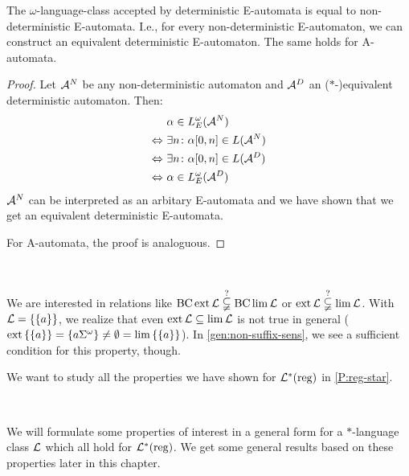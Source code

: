 \begin{lemma}
\label{gen:e-determinism}
The $\omega$-language-class accepted by deterministic E-automata is equal to non-deterministic E-automata. I.e., for every non-deterministic E-automaton, we can construct an equivalent deterministic E-automaton. The same holds for A-automata.
\begin{proof} Let $\mathcal{A}^N$ be any non-deterministic automaton and $\mathcal{A}^D$ an ($*$-)equivalent deterministic automaton. Then:
\begin{align*}
& \alpha \in L^{\omega}_E(\mathcal{A}^N) \\
\Leftrightarrow \ & \exists n \colon \alpha[0,n] \in L(\mathcal{A}^N) \\
\Leftrightarrow \ & \exists n \colon \alpha[0,n] \in L(\mathcal{A}^D) \\
\Leftrightarrow \ & \alpha \in L^{\omega}_E(\mathcal{A}^D)
\end{align*}
$\mathcal{A}^N$ can be interpreted as an arbitary E-automata and we have shown that we get an equivalent deterministic E-automata.

For A-automata, the proof is analoguous.
\end{proof}
\end{lemma}

\

We are interested in relations like $\operatorname{BC} \operatorname{ext} \mathcal{L} \overset{?}{\subsetneqq} \operatorname{BC} \lim \mathcal{L}$ or $\operatorname{ext} \mathcal{L} \overset{?}{\subsetneqq} \lim \mathcal{L}$. With $\Lang = \Set{\Set{a}}$, we realize that even $\operatorname{ext} \mathcal{L} \subseteq \lim \mathcal{L}$ is not true in general ($\ext \Set{\Set{a}} = \Set{a \Sigma^\omega} \neq \emptyset = \lim \Set{\Set{a}}$). In \cref{gen:non-suffix-sens}, we see a sufficient condition for this property, though.

We want to study all the properties we have shown for $\mathcal{L}^*(\textup{\textrm{reg}})$ in \cref{P:reg-star}.

\

We will formulate some properties of interest in a general form for a $*$-language class $\mathcal{L}$ which all hold for $\mathcal{L}^*(\textup{\textrm{reg}})$. We get some general results based on these properties later in this chapter. %


